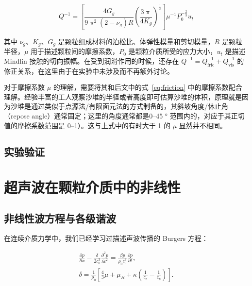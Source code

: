 \begin{equation}
  Q^{-1} = \left[\frac{4G_{g}}{9\uppi^2(2-\nu_{g})R}\left(\frac{3\uppi}{4K_{g}}\right)^{\frac{1}{3}}\right]\mu^{-1}P_{0}^{-\frac{2}{3}}u_{t}
\end{equation}

其中 $\nu_{g}$、$K_{g}$、$G_{g}$ 是颗粒组成材料的泊松比、体弹性模量和剪切模量，$R$ 是颗粒半径，$\mu$ 用于描述颗粒间的摩擦系数，$P_{0}$ 是颗粒介质所受的应力大小，$u_{t}$ 是描述 Mindlin 接触的切向振幅。在受到润滑作用的时候，还存在 $Q^{-1} = Q_{\text{fric}}^{-1} + Q_{\text{vis}}^{-1}$ 的修正关系，在这里由于在实验中未涉及而不再额外讨论。

对于摩擦系数 $\mu$ 的理解，需要将其和后文中的式~\eqref{eq:friction} 中的摩擦系数配合理解。经验丰富的工人观察沙堆的半径或者高度即可估算沙堆的体积，原理就是因为沙堆是通过类似于点源法/有限面元法的方式制备的，其斜坡角度/休止角（repose angle）通常固定；这里的角度通常都是\numrange{0}{45} \unit{\degree} 范围内的，对应于其正切值的摩擦系数范围是 \numrange{0}{1}）。这与上式中的有时大于 1 的 $\mu$ 显然并不相同。

\subsection{实验验证}



\section{超声波在颗粒介质中的非线性}


\subsection{非线性波方程与各级谐波}

在连续介质力学中，我们已经学习过描述声波传播的 Burgers 方程：

\begin{align}
  \frac{\partial p}{\partial x} - \frac{\delta}{2c_{0}^{3}}\frac{\partial^{2}p}{\partial t^{2}} = \frac{\beta p}{\rho_{0}c_{0}^{3}}\frac{\partial p}{\partial t},\label{eq:burgers_equation_1}\\
  \delta = \frac{1}{\rho_{0}}\left[\frac{4}{3}\mu + \mu_{B} + \kappa\left(\frac{1}{c_{v}} - \frac{1}{c_{p}}\right)\right].
\end{align}

